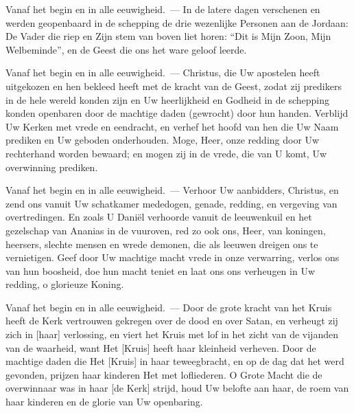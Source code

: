 \documentclass[12pt,twoside,a5paper]{article}
\begin{document}
\begin{halfparskip}
\end{halfparskip}

\begin{halfparskip}
   Vanaf het begin en in alle eeuwigheid.~--- In de latere dagen verschenen en werden geopenbaard in de schepping de drie wezenlijke Personen aan de Jordaan: De Vader die riep en Zijn stem van boven liet horen: ``Dit is Mijn Zoon, Mijn Welbeminde'', en de Geest die ons het ware geloof leerde.
\end{halfparskip}

\begin{halfparskip}
   
\end{halfparskip}

\begin{halfparskip}
   Vanaf het begin en in alle eeuwigheid.~--- Christus, die Uw apostelen heeft uitgekozen en hen bekleed heeft met de kracht van de Geest, zodat zij predikers in de hele wereld konden zijn en Uw heerlijkheid en Godheid in de schepping konden openbaren door de machtige daden (gewrocht) door hun handen. Verblijd Uw Kerken met vrede en eendracht, en verhef het hoofd van hen die Uw Naam prediken en Uw geboden onderhouden. Moge, Heer, onze redding door Uw rechterhand worden bewaard; en mogen zij in de vrede, die van U komt, Uw overwinning prediken.
\end{halfparskip}

\begin{halfparskip}
   Vanaf het begin en in alle eeuwigheid.~--- Verhoor Uw aanbidders, Christus, en zend ons vanuit Uw schatkamer mededogen, genade, redding, en vergeving van overtredingen. En zoals U Daniël verhoorde vanuit de leeuwenkuil en het gezelschap van Ananias in de vuuroven, red zo ook ons, Heer, van koningen, heersers, slechte mensen en wrede demonen, die als leeuwen dreigen ons te vernietigen. Geef door Uw machtige macht vrede in onze verwarring, verlos ons van hun boosheid, doe hun macht teniet en laat ons ons verheugen in Uw redding, o glorieuze Koning.
\end{halfparskip}

\begin{halfparskip}
   Vanaf het begin en in alle eeuwigheid.~--- Door de grote kracht van het Kruis heeft de Kerk vertrouwen gekregen over de dood en over Satan, en verheugt zij zich in [haar] verlossing, en viert het Kruis met lof in het zicht van de vijanden van de waarheid, want Het [Kruis] heeft haar kleinheid verheven. Door de machtige daden die Het [Kruis] in haar teweegbracht, en op de dag dat het werd gevonden, prijzen haar kinderen Het met lofliederen. O Grote Macht die de overwinnaar was in haar [de Kerk] strijd, houd Uw belofte aan haar, de roem van haar kinderen en de glorie van Uw openbaring.
\end{halfparskip}
\end{document}
